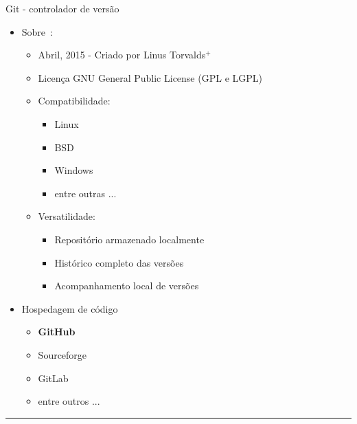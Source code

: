 \documentclass{beamer}
\begin{document}
\begin{frame}{Git - controlador de versão}
  \begin{itemize}
  \item Sobre~\cite{Wiki2017b}:
    \begin{itemize}
    \item Abril, 2015 - Criado por Linus Torvalds$^+$
    \item Licença GNU General Public License (GPL e LGPL)
    \item Compatibilidade:
      \begin{itemize}
      \item Linux
      \item BSD
      \item Windows
      \item entre outras ...        
      \end{itemize}
    \item Versatilidade:
      \begin{itemize}
      \item Repositório armazenado localmente
      \item Histórico completo das versões
      \item Acompanhamento local de versões
      \end{itemize}
    \end{itemize}
  \end{itemize}
  \begin{itemize}
  \item Hospedagem de código
    \begin{itemize}
    \item {\bf GitHub}
    \item Sourceforge
    \item GitLab
    \item entre outros ...
    \end{itemize}
  \end{itemize}
  \vspace{0.25cm}
  \begin{minipage}[hb!]{1.0\linewidth}
    \hrule
    \begin{bibdiv}
      \begin{biblist*}
      \end{biblist*}
    \end{bibdiv}
  \end{minipage}
\end{frame}
\end{document}
